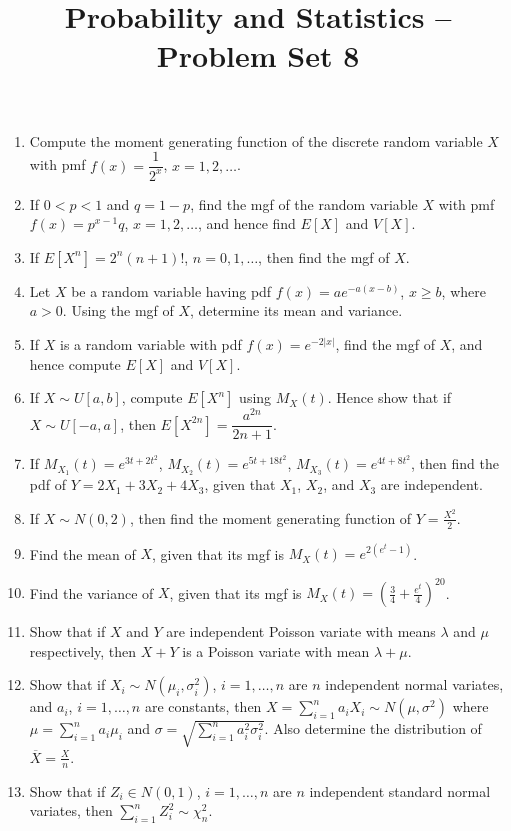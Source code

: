 \documentclass[svgnames]{amsart}
\title[]{Probability and Statistics -- Problem Set 8}
\begin{document}
\maketitle
\begin{enumerate}[leftmargin=*, itemsep=2mm]

\item Compute the moment generating function of the discrete random variable $X$ with pmf $f(x) = \dfrac{1}{2^x}$, $x = 1, 2, \ldots$.

\item If $0 < p < 1$ and $q = 1 - p$, find the mgf of the random variable $X$ with pmf $f(x) = p^{x - 1} q$, $x = 1, 2, \ldots$, and hence find $E[X]$ and $V[X]$.

\item If $E[X^n] = 2^n (n + 1)!$, $n = 0, 1, \ldots$, then find the mgf of $X$.

\item Let $X$ be a random variable having pdf $f(x) = a e^{-a(x - b)}$, $x \ge b$, where $a > 0$. Using the mgf of $X$, determine its mean and variance.

\item If $X$ is a random variable with pdf $f(x) = e^{-2|x|}$, find the mgf of $X$, and hence compute $E[X]$ and $V[X]$.

\item If $X \sim U[a, b]$, compute $E[X^n]$ using $M_X(t)$. Hence show that if $X \sim U[-a, a]$, then $E[X^{2n}] = \dfrac{a^{2n}}{2n + 1}$.

\item If $M_{X_1}(t) = e^{3t + 2t^2}$, $M_{X_2}(t) = e^{5t + 18t^2}$, $M_{X_3}(t) = e^{4t + 8t^2}$, then find the pdf of $Y = 2X_1 + 3X_2 + 4X_3$, given that $X_1$, $X_2$, and $X_3$ are independent.

\item If $X \sim N(0, 2)$, then find the moment generating function of $Y = \frac{X^2}{2}$.

\item Find the mean of $X$, given that its mgf is $M_X(t) = e^{2(e^t - 1)}$.

\item Find the variance of $X$, given that its mgf is $M_X(t) = \left(\frac 3 4 + \frac{e^t}{4}\right)^{20}$.

\item Show that if $X$ and $Y$ are independent Poisson variate with means $\lambda$ and $\mu$ respectively, then $X + Y$ is a Poisson variate with mean $\lambda + \mu$.

\item Show that if $X_i \sim N(\mu_i, \sigma_i^2)$, $i = 1, \ldots, n$ are $n$ independent normal variates, and $a_i$, $i = 1, \ldots, n$ are constants, then $X = \sum_{i=1}^{n} a_i X_i \sim N(\mu, \sigma^2)$ where $\mu = \sum_{i = 1}^{n} a_i \mu_i$ and $\sigma = \sqrt{\sum_{i = 1}^n a_i^2 \sigma_i^2}$. Also determine the distribution of $\overline X = \frac X n$.

\item Show that if $Z_i \in N(0, 1)$, $i = 1, \ldots, n$ are $n$ independent standard normal variates, then $\sum_{i = 1}^n Z_i^2 \sim \chi^2_n$.

\end{enumerate}
\end{document}
